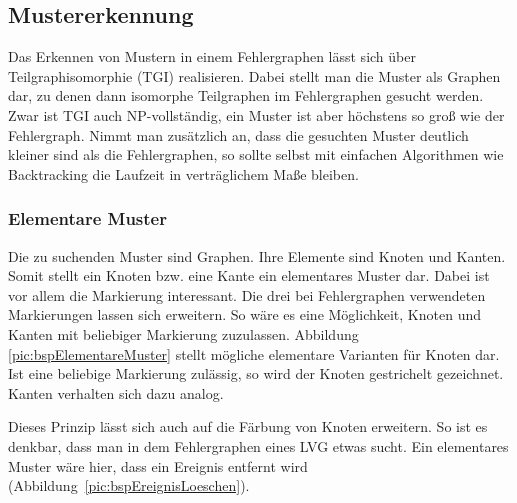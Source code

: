 \subsection{Mustererkennung}
Das Erkennen von Mustern in einem Fehlergraphen lässt sich über Teilgraphisomorphie (TGI) realisieren. 
Dabei stellt man die Muster als Graphen dar, zu denen dann isomorphe Teilgraphen im 
Fehlergraphen gesucht werden. Zwar ist TGI auch NP-vollständig, ein Muster ist aber 
höchstens so groß wie der Fehlergraph. Nimmt man zusätzlich an, dass die gesuchten Muster 
deutlich kleiner sind als die Fehlergraphen, so sollte selbst mit einfachen Algorithmen wie 
Backtracking die Laufzeit in verträglichem Maße bleiben.

\subsubsection{Elementare Muster}
Die zu suchenden Muster sind Graphen. Ihre Elemente sind Knoten und Kanten. Somit stellt 
ein Knoten bzw. eine Kante ein elementares Muster dar. Dabei ist vor allem die Markierung 
interessant. Die drei bei Fehlergraphen verwendeten Markierungen lassen sich erweitern. 
So wäre es eine Möglichkeit, Knoten und Kanten mit beliebiger Markierung zuzulassen. 
Abbildung \ref{pic:bspElementareMuster} stellt mögliche elementare Varianten für Knoten dar. Ist eine 
beliebige Markierung zulässig, so wird der Knoten gestrichelt gezeichnet. Kanten verhalten 
sich dazu analog.

Dieses Prinzip lässt sich auch auf die Färbung von Knoten erweitern. So ist es denkbar, 
dass man in dem Fehlergraphen eines LVG etwas sucht. Ein elementares Muster wäre hier, 
dass ein Ereignis entfernt wird (Abbildung~\ref{pic:bspEreignisLoeschen}).



